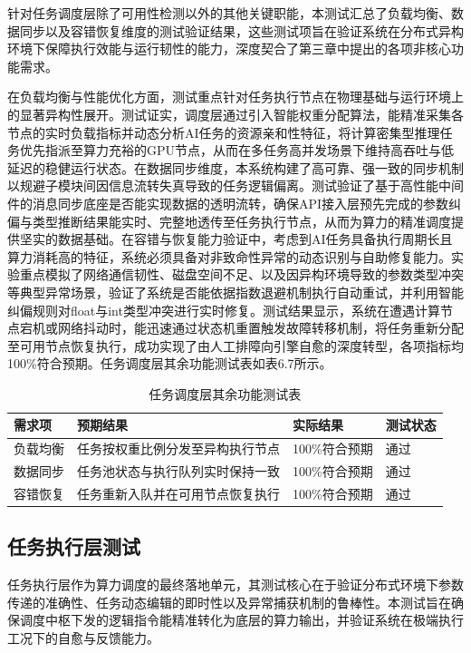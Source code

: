 针对任务调度层除了可用性检测以外的其他关键职能，本测试汇总了负载均衡、数据同步以及容错恢复维度的测试验证结果，这些测试项旨在验证系统在分布式异构环境下保障执行效能与运行韧性的能力，深度契合了第三章中提出的各项非核心功能需求。

在负载均衡与性能优化方面，测试重点针对任务执行节点在物理基础与运行环境上的显著异构性展开。测试证实，调度层通过引入智能权重分配算法，能精准采集各节点的实时负载指标并动态分析AI任务的资源亲和性特征，将计算密集型推理任务优先指派至算力充裕的GPU节点，从而在多任务高并发场景下维持高吞吐与低延迟的稳健运行状态。在数据同步维度，本系统构建了高可靠、强一致的同步机制以规避子模块间因信息流转失真导致的任务逻辑偏离。测试验证了基于高性能中间件的消息同步底座是否能实现数据的透明流转，确保API接入层预先完成的参数纠偏与类型推断结果能实时、完整地透传至任务执行节点，从而为算力的精准调度提供坚实的数据基础。在容错与恢复能力验证中，考虑到AI任务具备执行周期长且算力消耗高的特征，系统必须具备对非致命性异常的动态识别与自助修复能力。实验重点模拟了网络通信韧性、磁盘空间不足、以及因异构环境导致的参数类型冲突等典型异常场景，验证了系统是否能依据指数退避机制执行自动重试，并利用智能纠偏规则对float与int类型冲突进行实时修复。测试结果显示，系统在遭遇计算节点宕机或网络抖动时，能迅速通过状态机重置触发故障转移机制，将任务重新分配至可用节点恢复执行，成功实现了由人工排障向引擎自愈的深度转型，各项指标均100\%符合预期。任务调度层其余功能测试表如表6.7所示。

\begin{table}[htbp]
\centering
\caption{任务调度层其余功能测试表}
\begin{tabularx}{\textwidth}{lXll}
\toprule
\textbf{需求项} & \textbf{预期结果} & \textbf{实际结果} & \textbf{测试状态} \\
\midrule
负载均衡 & 任务按权重比例分发至异构执行节点 & 100\%符合预期 & 通过 \\
数据同步 & 任务池状态与执行队列实时保持一致 & 100\%符合预期 & 通过 \\
容错恢复 & 任务重新入队并在可用节点恢复执行 & 100\%符合预期 & 通过 \\
\bottomrule
\end{tabularx}
\end{table}

\subsection{任务执行层测试}

任务执行层作为算力调度的最终落地单元，其测试核心在于验证分布式环境下参数传递的准确性、任务动态编辑的即时性以及异常捕获机制的鲁棒性。本测试旨在确保调度中枢下发的逻辑指令能精准转化为底层的算力输出，并验证系统在极端执行工况下的自愈与反馈能力。

